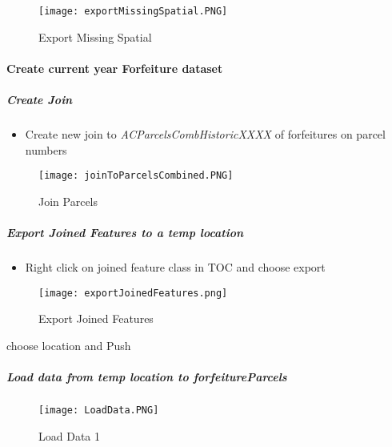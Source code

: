   \begin{figure}[h!]
  \centering
      \texttt{[image: exportMissingSpatial.PNG]}
  \caption{Export Missing Spatial}
  \end{figure}

  \clearpage

 \paragraph{Create current year Forfeiture dataset}
  \subparagraph{Create Join}
  \vspace{.3in}

 \begin{itemize}

 \item{Create new join to \emph{ACParcelsCombHistoricXXXX} of forfeitures on parcel numbers}

 \end{itemize}

  \vspace{.25in}

  \begin{figure}[h!]
  \centering
      \texttt{[image: joinToParcelsCombined.PNG]}
  \caption{Join Parcels}
  \end{figure}
  \clearpage
  \subparagraph[Export Joined Features]{Export Joined Features to a temp location \texorpdfstring{\\}{}}
  \begin{itemize}
  \item Right click {{\rtArrow}}  on joined feature class in TOC and choose export
 \end{itemize}
  \begin{figure}[h!]
  \centering
      \texttt{[image: exportJoinedFeatures.png]}
  \caption{Export Joined Features}
  \end{figure}
  {\bigbtn choose location and Push }
  \clearpage
  \subparagraph[Load data to forfeitureParcels]{\Large Load data from temp location to forfeitureParcels}
  \begin{figure}[h!]
  \centering
      \texttt{[image: LoadData.PNG]}
  \caption{Load Data 1}
  \end{figure}

